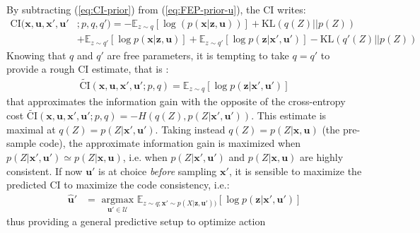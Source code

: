 \documentclass{article}
\begin{document}
By subtracting (\ref{eq:CI-prior}) from (\ref{eq:FEP-prior-u}), the CI writes:
\begin{align}
\text{CI}(\boldsymbol{x},\boldsymbol{u}, \boldsymbol{x}', \boldsymbol{u}'&;p,q,q')=
  - \mathbb{E}_{z\sim q} \left[\log (p(\boldsymbol{x}|\boldsymbol{z},\boldsymbol{u}))\right] +\text{KL}(q(Z)||p(Z))\nonumber\\
& + \mathbb{E}_{z\sim q'} \left[\log p(\boldsymbol{x}|\boldsymbol{z}, \boldsymbol{u})\right] 
+ \mathbb{E}_{z\sim q'} \left[\log p(\boldsymbol{z}|\boldsymbol{x}', \boldsymbol{u}')\right] -\text{KL}(q'(Z)||p(Z))\label{eq:CI}
\end{align} 
Knowing that $q$ and $q'$ are free parameters, it is tempting to take $q=q'$ to provide a rough CI estimate, that is :
\begin{align}
\tilde{\text{CI}}(\boldsymbol{x},\boldsymbol{u}, \boldsymbol{x}', \boldsymbol{u}';p, q) = \mathbb{E}_{z\sim q} \left[\log p(\boldsymbol{z}|\boldsymbol{x}', \boldsymbol{u}')\right]\label{eq:PCI}
\end{align}
that approximates the information gain with the opposite of the cross-entropy cost $\tilde{\text{CI}}(\boldsymbol{x},\boldsymbol{u}, \boldsymbol{x}', \boldsymbol{u}';p, q) = -H(q(Z),p(Z|\boldsymbol{x}', \boldsymbol{u}'))$.
This estimate is maximal at $q(Z) = p(Z|\boldsymbol{x}', \boldsymbol{u}')$. 
Taking instead $q(Z)= p(Z|\boldsymbol{x}, \boldsymbol{u})$ (the pre-sample code), the 
approximate information gain is maximized when $p(Z|\boldsymbol{x}', \boldsymbol{u}')\simeq p(Z|\boldsymbol{x}, \boldsymbol{u})$, i.e. when $p(Z|\boldsymbol{x}', \boldsymbol{u}')$ and $p(Z|\boldsymbol{x}, \boldsymbol{u})$ are highly consistent. If now $\boldsymbol{u}'$ is at choice \emph{before} sampling  $\boldsymbol{x}'$, it is sensible to maximize the predicted CI to maximize the code consistency, i.e.:
\begin{align}
\hat{\boldsymbol{u}}' 
&= \underset{\boldsymbol{u}' \in \mathcal{U}}{\text{ argmax }} \mathbb{E}_{z\sim q; \boldsymbol{x}'\sim p(X|\boldsymbol{z},\boldsymbol{u}'))} 
\left[\log p(\boldsymbol{z}|\boldsymbol{x}', \boldsymbol{u}')\right]
\end{align}
thus providing a general predictive setup to optimize action
\end{document}
